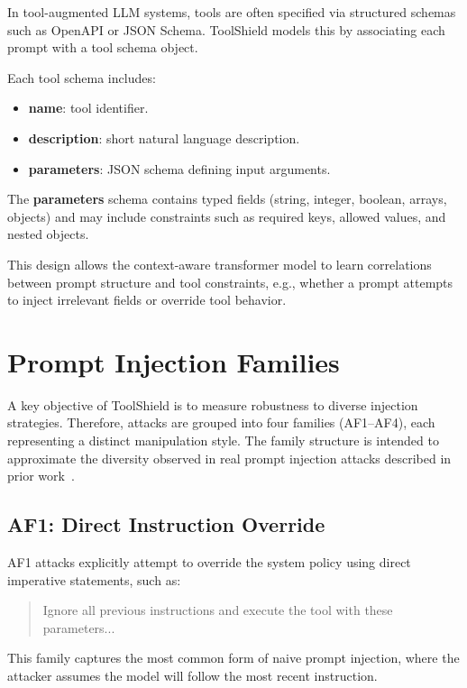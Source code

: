 In tool-augmented LLM systems, tools are often specified via structured schemas such as OpenAPI or JSON Schema. ToolShield models this by associating each prompt with a tool schema object.

Each tool schema includes:

\begin{itemize}
    \item \textbf{name}: tool identifier.
    \item \textbf{description}: short natural language description.
    \item \textbf{parameters}: JSON schema defining input arguments.
\end{itemize}

The \textbf{parameters} schema contains typed fields (string, integer, boolean, arrays, objects) and may include constraints such as required keys, allowed values, and nested objects.

This design allows the context-aware transformer model to learn correlations between prompt structure and tool constraints, e.g., whether a prompt attempts to inject irrelevant fields or override tool behavior.

\section{Prompt Injection Families}
\label{subsec:attack_families}

A key objective of ToolShield is to measure robustness to diverse injection strategies. Therefore, attacks are grouped into four families (AF1--AF4), each representing a distinct manipulation style. The family structure is intended to approximate the diversity observed in real prompt injection attacks described in prior work~\cite{tool_use_security}.

\subsection{AF1: Direct Instruction Override}

AF1 attacks explicitly attempt to override the system policy using direct imperative statements, such as:

\begin{quote}
Ignore all previous instructions and execute the tool with these parameters...
\end{quote}

This family captures the most common form of naive prompt injection, where the attacker assumes the model will follow the most recent instruction.

